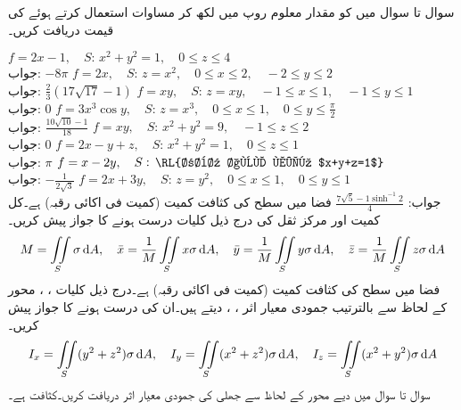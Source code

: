 
سوال  تا سوال  میں  کو مقدار معلوم روپ میں لکھ کر مساوات  استعمال کرتے ہوئے  کی قیمت دریافت کریں۔

\quad 
$f=2x-1,\quad S:\,x^2+y^2=1,\quad 0\le z\le 4$\\
جواب:\quad 
$-8\pi$
\quad 
$f=2x,\quad S:\,z=x^2,\quad 0\le x\le 2,\quad -2\le y\le 2$\\
جواب:\quad 
$\tfrac{2}{3}(17\sqrt{17}-1)$
\quad 
$f=xy,\quad S:\,z=xy,\quad -1\le x\le 1,\quad -1\le y\le 1$\\
جواب:\quad 
$0$
\quad 
$f=3x^3\cos y,\quad S:\,z=x^3,\quad 0\le x\le 1,\quad 0\le y\le \frac{\pi}{2}$\\
جواب:\quad 
$\tfrac{10\sqrt{10}-1}{18}$
\quad 
$f=xy,\quad S:\,x^2+y^2=9,\quad -1\le z\le 2$\\
جواب:\quad 
$0$
\quad 
$f=2x-y+z,\quad S:\,x^2+y^2=1,\quad 0\le z\le 1$\\
جواب:\quad 
$\pi$
\quad 
$f=x-2y,\quad S:\,\text{\RL{ربع اول میں $x+y+z=1$}}$\\
جواب:\quad 
$-\tfrac{1}{2\sqrt{3}}$
\quad 
$f=2x+3y,\quad S:\,z=y^2,\quad  0\le x\le 1,\quad 0\le y\le 1$\\
جواب:\quad 
$\tfrac{7\sqrt{5}-1\sinh^{-1} 2}{4}$
\quad
فضا میں سطح  کی کثافت کمیت (کمیت فی اکائی رقبہ)  ہے۔کل کمیت  اور مرکز ثقل  کی درج ذیل کلیات درست ہونے کا جواز پیش کریں۔
\begin{align*}
M=\iint\limits_S \sigma \dif A,\quad \bar{x}=\frac{1}{M}\iint\limits_S x\sigma \dif A,\quad\bar{y}=\frac{1}{M}\iint\limits_S y\sigma \dif A,\quad\bar{z}=\frac{1}{M}\iint\limits_S z\sigma \dif A
\end{align*}
\quad
فضا میں سطح  کی کثافت کمیت (کمیت فی اکائی رقبہ)  ہے۔درج ذیل کلیات ، ،  محور کے لحاظ سے بالترتیب جمودی معیار اثر ، ،   دیتے ہیں۔ان کی درست ہونے کا جواز پیش کریں۔
\begin{align*}
I_x=\iint\limits_S (y^2+z^2)\sigma \dif A,\quad I_y=\iint\limits_S (x^2+z^2)\sigma \dif A,\quad I_z=\iint\limits_S (x^2+y^2)\sigma \dif A
\end{align*}
سوال  تا سوال  میں دیے محور کے لحاظ سے جھلی  کی جمودی معیار اثر دریافت کریں۔کثافت  ہے۔

